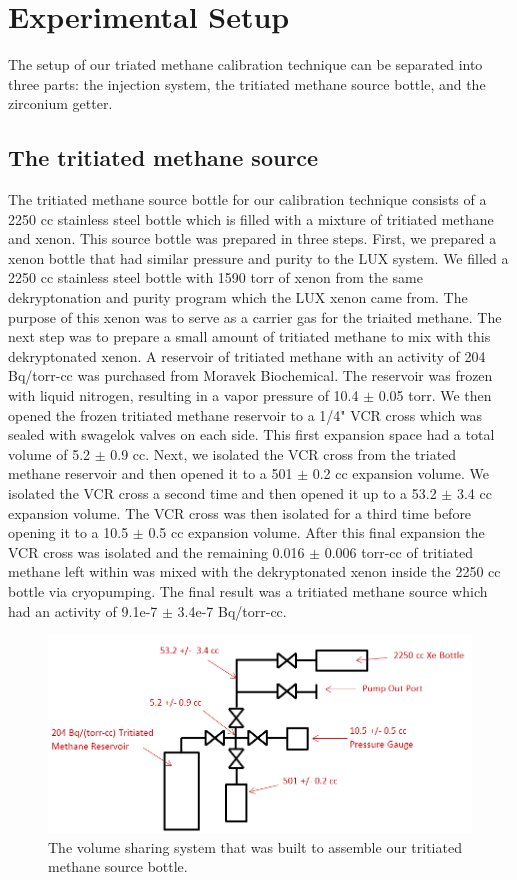 \section{Experimental Setup}

The setup of our triated methane calibration technique can be separated into three parts: the injection system, the tritiated methane source bottle, and the zirconium getter.

\subsection{The tritiated methane source}

The tritiated methane source bottle for our calibration technique consists of a 2250 cc stainless steel bottle which is filled with a mixture of tritiated methane and xenon.  This source bottle was prepared in three steps.  First, we prepared a xenon bottle that had similar pressure and purity to the LUX system.  We filled a 2250 cc stainless steel bottle with 1590 torr of xenon from the same dekryptonation and purity program which the LUX xenon came from. The purpose of this xenon was to serve as a carrier gas for the triaited methane.  The next step was to prepare a small amount of tritiated methane to mix with this dekryptonated xenon.  A reservoir of tritiated methane with an activity of 204 Bq/torr-cc was purchased from Moravek Biochemical.  The reservoir was frozen with liquid nitrogen, resulting in a vapor pressure of 10.4 $\pm$ 0.05 torr.  We then opened the frozen tritiated methane reservoir to a 1/4" VCR cross which was sealed with swagelok valves on each side.  This first expansion space had a total volume of 5.2 $\pm$ 0.9 cc. Next, we isolated the VCR cross from the triated methane reservoir and then opened it to a 501 $\pm$ 0.2 cc expansion volume.  We isolated the VCR cross a second time and then opened it up to a 53.2 $\pm$ 3.4 cc expansion volume.  The VCR cross was then isolated for a third time before opening it to a 10.5 $\pm$ 0.5 cc expansion volume.  After this final expansion the VCR cross was isolated and the remaining 0.016 $\pm$ 0.006 torr-cc of tritiated methane left within was mixed with the dekryptonated xenon inside the 2250 cc bottle via cryopumping.  The final result was a tritiated methane source which had an activity of 9.1e-7 $\pm$ 3.4e-7 Bq/torr-cc.

\begin{figure}[H]
\centering
\includegraphics[scale=0.3]{BottleSetup.png}
\caption{The volume sharing system that was built to assemble our tritiated methane source bottle.}
\label{fig:BottleSetup}
\end{figure}


